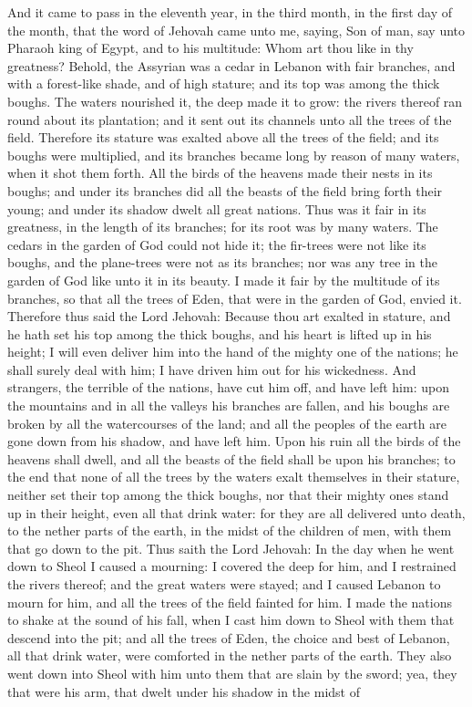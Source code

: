 And it came to pass in the eleventh year, in the third month, in the first day of the month, that the word of Jehovah came unto me, saying, Son of man, say unto Pharaoh king of Egypt, and to his multitude: Whom art thou like in thy greatness? Behold, the Assyrian was a cedar in Lebanon with fair branches, and with a forest-like shade, and of high stature; and its top was among the thick boughs. The waters nourished it, the deep made it to grow: the rivers thereof ran round about its plantation; and it sent out its channels unto all the trees of the field. Therefore its stature was exalted above all the trees of the field; and its boughs were multiplied, and its branches became long by reason of many waters, when it shot them forth. All the birds of the heavens made their nests in its boughs; and under its branches did all the beasts of the field bring forth their young; and under its shadow dwelt all great nations. Thus was it fair in its greatness, in the length of its branches; for its root was by many waters. The cedars in the garden of God could not hide it; the fir-trees were not like its boughs, and the plane-trees were not as its branches; nor was any tree in the garden of God like unto it in its beauty. I made it fair by the multitude of its branches, so that all the trees of Eden, that were in the garden of God, envied it.  Therefore thus said the Lord Jehovah: Because thou art exalted in stature, and he hath set his top among the thick boughs, and his heart is lifted up in his height; I will even deliver him into the hand of the mighty one of the nations; he shall surely deal with him; I have driven him out for his wickedness. And strangers, the terrible of the nations, have cut him off, and have left him: upon the mountains and in all the valleys his branches are fallen, and his boughs are broken by all the watercourses of the land; and all the peoples of the earth are gone down from his shadow, and have left him. Upon his ruin all the birds of the heavens shall dwell, and all the beasts of the field shall be upon his branches; to the end that none of all the trees by the waters exalt themselves in their stature, neither set their top among the thick boughs, nor that their mighty ones stand up in their height, even all that drink water: for they are all delivered unto death, to the nether parts of the earth, in the midst of the children of men, with them that go down to the pit.  Thus saith the Lord Jehovah: In the day when he went down to Sheol I caused a mourning: I covered the deep for him, and I restrained the rivers thereof; and the great waters were stayed; and I caused Lebanon to mourn for him, and all the trees of the field fainted for him. I made the nations to shake at the sound of his fall, when I cast him down to Sheol with them that descend into the pit; and all the trees of Eden, the choice and best of Lebanon, all that drink water, were comforted in the nether parts of the earth. They also went down into Sheol with him unto them that are slain by the sword; yea, they that were his arm, that dwelt under his shadow in the midst of 